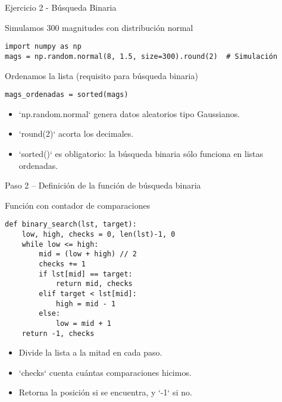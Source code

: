 \documentclass[10pt]{beamer}
\begin{document}
\begin{frame}[fragile]{Ejercicio 2 - Búsqueda Binaria}
  \begin{block}{Simulamos 300 magnitudes con distribución normal}
  \begin{verbatim}
import numpy as np
mags = np.random.normal(8, 1.5, size=300).round(2)  # Simulación
  \end{verbatim}
  \end{block}

  \begin{block}{Ordenamos la lista (requisito para búsqueda binaria)}
  \begin{verbatim}
mags_ordenadas = sorted(mags)
  \end{verbatim}
  \end{block}

  \begin{itemize}
    \item `np.random.normal` genera datos aleatorios tipo Gaussianos.
    \item `round(2)` acorta los decimales.
    \item `sorted()` es obligatorio: la búsqueda binaria sólo funciona en listas ordenadas.
  \end{itemize}
\end{frame}


\begin{frame}[fragile]{Paso 2 – Definición de la función de búsqueda binaria}
  \begin{block}{Función con contador de comparaciones}
  \begin{verbatim}
def binary_search(lst, target):
    low, high, checks = 0, len(lst)-1, 0
    while low <= high:
        mid = (low + high) // 2
        checks += 1
        if lst[mid] == target:
            return mid, checks
        elif target < lst[mid]:
            high = mid - 1
        else:
            low = mid + 1
    return -1, checks
  \end{verbatim}
  \end{block}

  \begin{itemize}
    \item Divide la lista a la mitad en cada paso.
    \item `checks` cuenta cuántas comparaciones hicimos.
    \item Retorna la posición si se encuentra, y `-1` si no.
  \end{itemize}
\end{frame}
\end{document}
